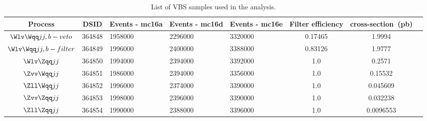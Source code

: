 \begin{table}[!htbp]
\begin{center}
\small
\caption{List of VBS samples used in the analysis.}
\begin{tabularx}{\textwidth}{|c|c|X|X|X|c|c|c|}
\hline
Process & DSID & Events - mc16a & Events - mc16d & Events - mc16e & Filter efficiency & cross-section~(pb) \\
\hline

$\Wlv\Wqq jj, b-veto$    & 364848   &   1958000 &  2296000 & 3320000 & 0.17465  &  1.9994  \\
$\Wlv\Wqq jj, b-filter$  & 364849   &   1996000 &  2400000 & 3388000 & 0.83126  &  1.9777  \\
$\Wlv\Zqq jj$            & 364850   &   1994000 &  2394000 & 3392000 & 1.0  &  0.2571  \\
$\Zvv\Wqq jj$            & 364851   &   1986000 &  2394000 & 3356000 & 1.0  &  0.15532  \\
$\Zll\Wqq jj$            & 364852   &   1996000 &  2374000 & 3390000 & 1.0  &  0.045609  \\
$\Zvv\Zqq jj$            & 364853   &   1998000 &  2396000 & 3390000 & 1.0  &  0.032238  \\
$\Zll\Zqq jj$            & 364854   &   1990000 &  2388000 & 3396000 & 1.0  &  0.0096553  \\

\hline
\end{tabularx}
\label{tab:VBS_sig_samples}
\end{center}
\end{table}


